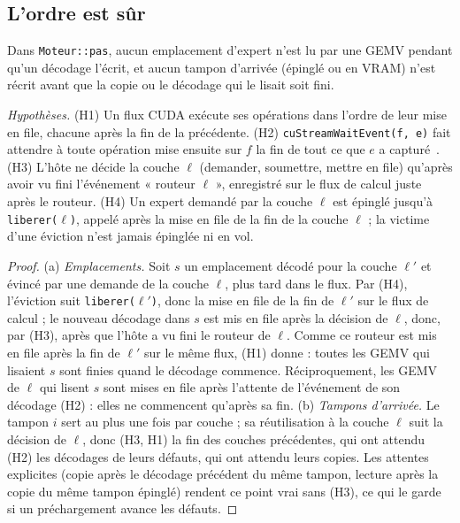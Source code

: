 \subsection{L'ordre est sûr}

\begin{lemme}\label{lem:t2o-ordre}
Dans \texttt{Moteur::pas}, aucun emplacement d'expert n'est lu par une GEMV pendant qu'un décodage l'écrit, et aucun tampon d'arrivée (épinglé ou en VRAM) n'est récrit avant que la copie ou le décodage qui le lisait soit fini.
\end{lemme}

\emph{Hypothèses.} (H1) Un flux CUDA exécute ses opérations dans l'ordre de leur mise en file, chacune après la fin de la précédente. (H2) \texttt{cuStreamWaitEvent(f, e)} fait attendre à toute opération mise ensuite sur $f$ la fin de tout ce que $e$ a capturé~\cite{nvidia2026driverstream}. (H3) L'hôte ne décide la couche $\ell$ (demander, soumettre, mettre en file) qu'après avoir vu fini l'événement « routeur $\ell$ », enregistré sur le flux de calcul juste après le routeur. (H4) Un expert demandé par la couche $\ell$ est épinglé jusqu'à \texttt{liberer($\ell$)}, appelé après la mise en file de la fin de la couche $\ell$ ; la victime d'une éviction n'est jamais épinglée ni en vol.

\begin{proof}
(a) \emph{Emplacements.} Soit $s$ un emplacement décodé pour la couche $\ell'$ et évincé par une demande de la couche $\ell$, plus tard dans le flux. Par (H4), l'éviction suit \texttt{liberer($\ell'$)}, donc la mise en file de la fin de $\ell'$ sur le flux de calcul ; le nouveau décodage dans $s$ est mis en file après la décision de $\ell$, donc, par (H3), après que l'hôte a vu fini le routeur de $\ell$. Comme ce routeur est mis en file après la fin de $\ell'$ sur le même flux, (H1) donne : toutes les GEMV qui lisaient $s$ sont finies quand le décodage commence. Réciproquement, les GEMV de $\ell$ qui lisent $s$ sont mises en file après l'attente de l'événement de son décodage (H2) : elles ne commencent qu'après sa fin.
(b) \emph{Tampons d'arrivée.} Le tampon $i$ sert au plus une fois par couche ; sa réutilisation à la couche $\ell$ suit la décision de $\ell$, donc (H3, H1) la fin des couches précédentes, qui ont attendu (H2) les décodages de leurs défauts, qui ont attendu leurs copies. Les attentes explicites (copie après le décodage précédent du même tampon, lecture après la copie du même tampon épinglé) rendent ce point vrai sans (H3), ce qui le garde si un préchargement avance les défauts.
\end{proof}

